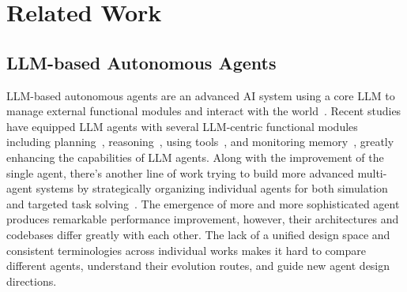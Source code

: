 
\section{Related Work}
\subsection{LLM-based Autonomous Agents}
LLM-based autonomous agents are an advanced AI system using a core LLM to manage external functional modules and interact with the world~\citep{ding2024understanding}.  
Recent studies have equipped LLM agents with several LLM-centric functional modules including planning~\citep{hao2023reasoning,zeng2024perceive,shao2025division}, reasoning~\citep{wei2022chain,yao2024tree,shang2024defint,xu2025towards}, using tools~\citep{shen2024hugginggpt,schick2024toolformer}, and monitoring memory~\citep{wang2024voyager,park2023generative}, greatly enhancing the capabilities of LLM agents. 
Along with the improvement of the single agent, there's another line of work trying to build more advanced multi-agent systems by strategically organizing individual agents for both simulation~\citep{li2023metaagents,chen2023agentverse} and targeted task solving~\citep{qian2024chatdev,chen2024large,li2024limp}.
The emergence of more and more sophisticated agent produces remarkable performance improvement, however, their architectures and codebases differ greatly with each other.
The lack of a unified design space and consistent terminologies across individual works makes it hard to compare different agents, understand their evolution routes, and guide new agent design directions.



